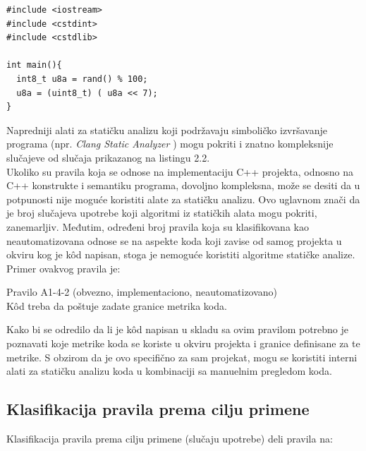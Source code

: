 \documentclass[12pt,oneside]{memoir}
\begin{document}
\begin{lstlisting}[style=customc, caption={K\^{o}d čija se ispravnost jednostavno može utvrditi statičkom analizom.},label={lst:label2}]
#include <iostream>
#include <cstdint>
#include <cstdlib>

int main(){
  int8_t u8a = rand() % 100;
  u8a = (uint8_t) ( u8a << 7);
}
\end{lstlisting}

  Napredniji alati za statičku analizu koji podržavaju simboličko izvršavanje programa (npr. \textit{Clang Static Analyzer} \cite{CSAWebsite}) mogu pokriti i znatno kompleksnije 
  slučajeve od slučaja prikazanog na listingu 2.2.
  \\
  \indent 
  Ukoliko su pravila koja se odnose na implementaciju C++ projekta, odnosno na C++ konstrukte i semantiku programa, dovoljno kompleksna, može se desiti da u potpunosti nije moguće koristiti alate za statičku analizu. Ovo uglavnom znači da je broj slučajeva upotrebe koji algoritmi iz statičkih alata mogu pokriti, zanemarljiv. Međutim, određeni broj pravila koja su klasifikovana kao neautomatizovana odnose se na aspekte koda koji zavise od samog projekta
  u okviru kog je k\^{o}d napisan, stoga je nemoguće koristiti algoritme statičke analize.
  Primer ovakvog pravila je:

\begin{center}
\begin{tcolorbox}
Pravilo A1-4-2 (obvezno, implementaciono, neautomatizovano) \\
K\^{o}d treba da poštuje zadate granice metrika koda.
\end{tcolorbox}
\end{center}


  Kako bi se odredilo da li je k\^{o}d napisan u skladu sa ovim pravilom potrebno je poznavati koje metrike koda se koriste u okviru projekta i
  granice definisane za te metrike. S obzirom da je ovo specifično za sam projekat, mogu se koristiti interni alati za statičku analizu koda u kombinaciji
  sa manuelnim pregledom koda. 

\subsection{Klasifikacija pravila prema cilju primene}
Klasifikacija pravila prema cilju primene (slučaju upotrebe) deli pravila na:
\end{document}
